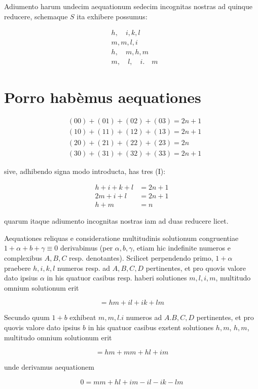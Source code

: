 \documentclass[10pt]{article}
\begin{document}
Adiumento harum undecim aequationum sedecim incognitas nostras ad quinque reducere, schemaque \(S\) ita exhibere possumus:

\[
\begin{aligned}
& h, \quad i, k, l \\
& m, m, l, i \\
& h, \quad m, h, m \\
& m, \quad l, \quad i . \quad m
\end{aligned}
\]

\section*{Porro habèmus aequationes}
\[
\begin{aligned}
& (00)+(01)+(02)+(03)=2 n+1 \\
& (10)+(11)+(12)+(13)=2 n+1 \\
& (20)+(21)+(22)+(23)=2 n \\
& (30)+(31)+(32)+(33)=2 n+1
\end{aligned}
\]

sive, adhibendo signa modo introducta, has tres (I):

\[
\begin{aligned}
h+i+k+l & =2 n+1 \\
2 m+i+l & =2 n+1 \\
h+m & =n
\end{aligned}
\]

quarum itaque adiumento incognitas nostras iam ad duas reducere licet.

Aequationes reliquas e consideratione multitudinis solutionum congruentiae \(1+\alpha+b+\gamma \equiv 0\) derivabimus (per \(\alpha, b, \gamma\), etiam hic indefinite numeros e complexibus \(A, B, C\) resp. denotantes). Scilicet perpendendo primo, \(1+\alpha\) praebere \(h, i, k, l\) numeros resp. ad \(A, B, C, D\) pertinentes, et pro quovis valore dato ipsius \(\alpha\) in his quatuor casibus resp. haberi solutiones \(m, l, i, m\), multitudo omnium solutionum erit

\[
=h m+i l+i k+l m
\]

Secundo quum \(1+b\) exhibeat \(m, m, l . i\) numeros ad \(A . B, C, D\) pertinentes, et pro quovis valore dato ipsius \(b\) in his quatuor casibus exstent solutiones \(h, m\), \(h, m\), multitudo omnium solutionum erit

\[
=h m+m m+h l+i m
\]

unde derivamus aequationem

\[
0=m m+h l+i m-i l-i k-l m
\]
\end{document}
